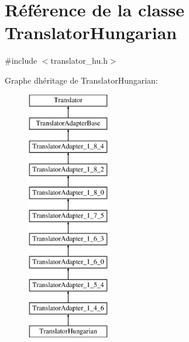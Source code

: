 \hypertarget{class_translator_hungarian}{}\section{Référence de la classe Translator\+Hungarian}
\label{class_translator_hungarian}


{\ttfamily \#include $<$translator\+\_\+hu.\+h$>$}

Graphe d\textquotesingle{}héritage de Translator\+Hungarian\+:\begin{figure}[H]
\begin{center}
\leavevmode
\includegraphics[height=11.000000cm]{class_translator_hungarian}
\end{center}
\end{figure}
